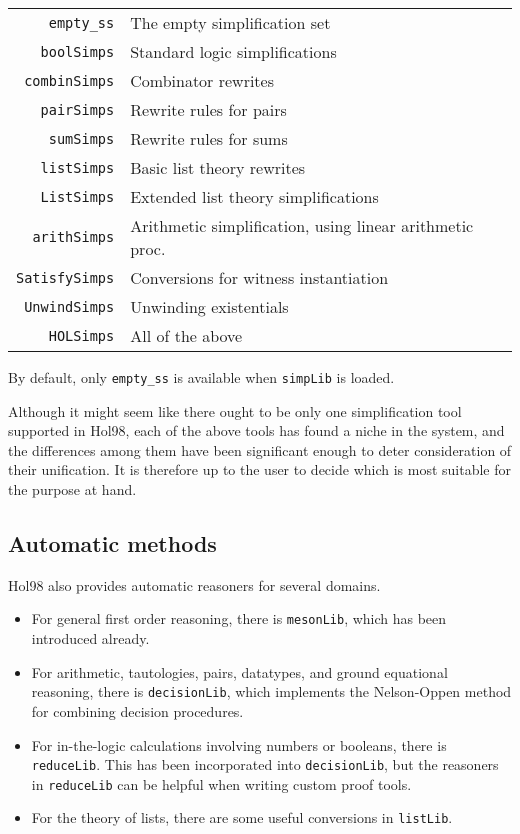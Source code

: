 \begin{description}
\begin{center}
\begin{tabular}{|r|l|} \hline
\verb+empty_ss+ & The empty simplification set \\
\verb+boolSimps+ & Standard logic simplifications \\
\verb+combinSimps+ & Combinator rewrites \\
\verb+pairSimps+ & Rewrite rules for pairs \\
\verb+sumSimps+ & Rewrite rules for sums \\
\verb+listSimps+ & Basic list theory rewrites \\ 
\verb+ListSimps+ & Extended list theory simplifications \\
\verb+arithSimps+ & Arithmetic simplification, using linear arithmetic proc. \\
\verb+SatisfySimps+ & Conversions for witness instantiation \\
\verb+UnwindSimps+ & Unwinding existentials \\
\verb+HOLSimps+ &  All of the above \\
 \hline
\end{tabular}
\end{center}

By default, only \verb+empty_ss+ is available when \verb+simpLib+ is loaded.
\end{description}

Although it might seem like there ought to be only one simplification
tool supported in Hol98, each of the above tools has found a niche in
the system, and the differences among them have been significant enough
to deter consideration of their unification. It is therefore up to the
user to decide which is most suitable for the purpose at hand.


\subsection{Automatic methods}

Hol98 also provides automatic reasoners for several domains. 

\begin{itemize}

\item For general first order reasoning, there is \verb+mesonLib+, which
      has been introduced already.

\item For arithmetic, tautologies, pairs, datatypes, and ground
      equational reasoning, there is \verb+decisionLib+, which
      implements the Nelson-Oppen method for combining decision procedures.

\item For in-the-logic calculations involving numbers or booleans, there
      is \verb+reduceLib+. This has been incorporated into
      \verb+decisionLib+, but the reasoners in \verb+reduceLib+ can be
      helpful when writing custom proof tools.

\item For the theory of lists, there are some useful conversions in
      \verb+listLib+. 
\end{itemize}


